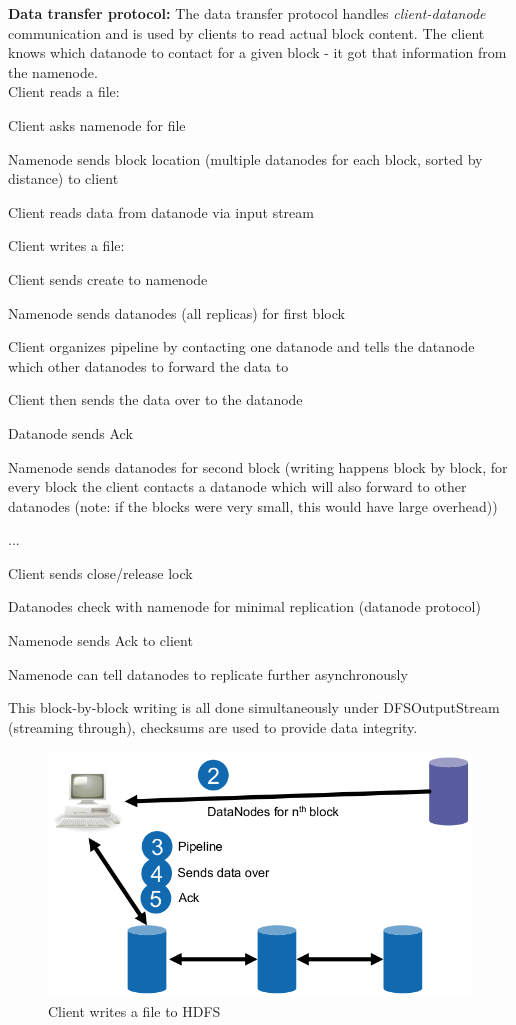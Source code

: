 \documentclass[11pt,oneside,a4paper]{article}
\begin{document}
\textbf{Data transfer protocol:} The data transfer protocol handles \textit{client-datanode} communication and is used by clients to read actual block content. The client knows which datanode to contact for a given block - it got that information from the namenode.\\
Client reads a file:

\begin{compactenum}
	\item Client asks namenode for file
	\item Namenode sends block location (multiple datanodes for each block, sorted by distance) to client
	\item Client reads data from datanode via input stream\\
\end{compactenum}

Client writes a file:

\begin{compactenum}
	\item Client sends create to namenode
	\item Namenode sends datanodes (all replicas) for first block
	\item Client organizes pipeline by contacting one datanode and tells the datanode which other datanodes to forward the data to
	\item Client then sends the data over to the datanode
	\item Datanode sends Ack
	\item Namenode sends datanodes for second block (writing happens block by block, for every block the client contacts a datanode which will also forward to other datanodes (note: if the blocks were very small, this would have large overhead))
	\item ...
	\item Client sends close/release lock
	\item Datanodes check with namenode for minimal replication (datanode protocol)
	\item Namenode sends Ack to client
	\item Namenode can tell datanodes to replicate further asynchronously
\end{compactenum}

This block-by-block writing is all done simultaneously under DFSOutputStream (streaming through), checksums are used to provide data integrity.

\begin{figure}[t!]
	\centering
	\includegraphics[width=0.4\linewidth]{figures/hdfs_client_write}
	\caption{Client writes a file to HDFS}
	\label{fig:hdfsclientwrite}
\end{figure}
\end{document}
